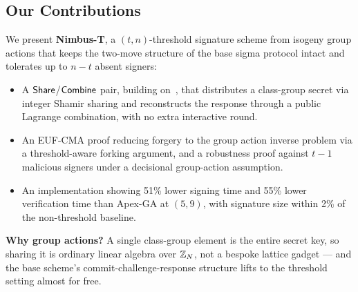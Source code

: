 \subsection{Our Contributions}
We present \textbf{Nimbus-T}, a $(t,n)$-threshold signature scheme from isogeny group actions that keeps the two-move structure of the base sigma protocol intact and tolerates up to $n-t$ absent signers:
\begin{itemize}[leftmargin=*]
  \item A $\mathsf{Share}$/$\mathsf{Combine}$ pair, building on~\cite{tran2024dkg}, that distributes a class-group secret via integer Shamir sharing and reconstructs the response through a public Lagrange combination, with no extra interactive round.
  \item An EUF-CMA proof reducing forgery to the group action inverse problem via a threshold-aware forking argument, and a robustness proof against $t-1$ malicious signers under a decisional group-action assumption.
  \item An implementation showing 51\% lower signing time and 55\% lower verification time than Apex-GA at $(5,9)$, with signature size within 2\% of the non-threshold baseline.
\end{itemize}

\begin{tcolorbox}
  \textbf{Why group actions?} A single class-group element is the entire secret key, so sharing it is ordinary linear algebra over $\mathbb{Z}_N$, not a bespoke lattice gadget --- and the base scheme's commit-challenge-response structure lifts to the threshold setting almost for free.
\end{tcolorbox}

